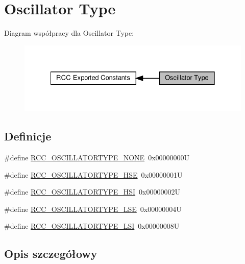 \hypertarget{group___r_c_c___oscillator___type}{}\section{Oscillator Type}
\label{group___r_c_c___oscillator___type}
Diagram współpracy dla Oscillator Type\+:\nopagebreak
\begin{figure}[H]
\begin{center}
\leavevmode
\includegraphics[width=328pt]{group___r_c_c___oscillator___type}
\end{center}
\end{figure}
\subsection*{Definicje}
\begin{DoxyCompactItemize}
\item 
\#define \hyperlink{group___r_c_c___oscillator___type_ga5a790362c5d7c4263f0f75a7367dd6b9}{R\+C\+C\+\_\+\+O\+S\+C\+I\+L\+L\+A\+T\+O\+R\+T\+Y\+P\+E\+\_\+\+N\+O\+NE}~0x00000000U
\item 
\#define \hyperlink{group___r_c_c___oscillator___type_ga28cacd402dec84e548c9e4ba86d4603f}{R\+C\+C\+\_\+\+O\+S\+C\+I\+L\+L\+A\+T\+O\+R\+T\+Y\+P\+E\+\_\+\+H\+SE}~0x00000001U
\item 
\#define \hyperlink{group___r_c_c___oscillator___type_gaa7ff7cbe9b0c2c511b0d0555e2a32a23}{R\+C\+C\+\_\+\+O\+S\+C\+I\+L\+L\+A\+T\+O\+R\+T\+Y\+P\+E\+\_\+\+H\+SI}~0x00000002U
\item 
\#define \hyperlink{group___r_c_c___oscillator___type_ga7036aec5659343c695d795e04d9152ba}{R\+C\+C\+\_\+\+O\+S\+C\+I\+L\+L\+A\+T\+O\+R\+T\+Y\+P\+E\+\_\+\+L\+SE}~0x00000004U
\item 
\#define \hyperlink{group___r_c_c___oscillator___type_ga3b7abb8ce0544cca0aa4550540194ce2}{R\+C\+C\+\_\+\+O\+S\+C\+I\+L\+L\+A\+T\+O\+R\+T\+Y\+P\+E\+\_\+\+L\+SI}~0x00000008U
\end{DoxyCompactItemize}


\subsection{Opis szczegółowy}



